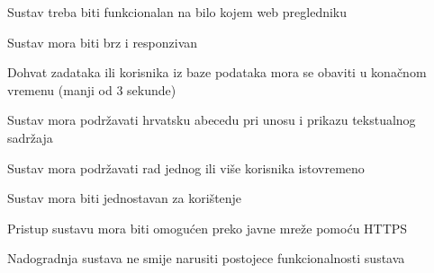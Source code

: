 			\begin{packed_item}
				\item Sustav treba biti funkcionalan na bilo kojem web pregledniku 
				\item Sustav mora biti brz i responzivan
				\item Dohvat zadataka ili korisnika iz baze podataka mora se obaviti u konačnom vremenu (manji od 3 sekunde)
				\item Sustav mora podržavati hrvatsku abecedu pri unosu i prikazu tekstualnog sadržaja
				\item Sustav mora podržavati rad jednog ili više korisnika istovremeno 
				\item Sustav mora biti jednostavan za korištenje 
				\item Pristup sustavu mora biti omogućen preko javne mreže pomoću HTTPS
				\item Nadogradnja sustava ne smije narusiti postojece funkcionalnosti sustava 
			\end{packed_item}
				
			
			 
			 
	